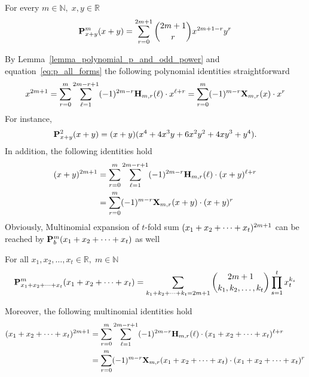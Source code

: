 \begin{lem}
    \label{lemma_polynomial_p_and_odd_power}
    For every $m\in\mathbb{N}, \; x,y\in\mathbb{R}$
    \begin{equation*}
        \polynomialP{m}{x+y}{x+y} = \sum_{r=0}^{2m+1} \binom{2m+1}{r} x^{2m+1-r} y^r
    \end{equation*}
\end{lem}
By Lemma~\ref{lemma_polynomial_p_and_odd_power} and equation~\eqref{eq:p_all_forms} the following
polynomial identities straightforward
\begin{equation*}
    x^{2m+1}
    =\sum_{r=0}^{m} \sum_{\ell=1}^{2m-r+1} (-1)^{2m-r} \coeffH{m}{r}{\ell} \cdot x^{\ell+r}
    =\sum_{r=0}^{m} (-1)^{m-r} \polynomialX{m}{r}{x} \cdot x^r
\end{equation*}
For instance,
\begin{equation*}
    \polynomialP{2}{x+y}{x+y} = (x + y) (x^4 + 4 x^3 y + 6 x^2 y^2 + 4 x y^3 + y^4).
\end{equation*}
In addition, the following identities hold
\begin{equation*}
    \begin{split}
    (x+y)
        ^{2m+1}
        &=\sum_{r=0}^{m} \sum_{\ell=1}^{2m-r+1} (-1)^{2m-r} \coeffH{m}{r}{\ell} \cdot (x+y)^{\ell+r} \\
        &=\sum_{r=0}^{m} (-1)^{m-r} \polynomialX{m}{r}{x+y} \cdot (x+y)^r
    \end{split}
\end{equation*}
Obviously, Multinomial expansion of $t$-fold sum $(\multifoldSum{t})^{2m+1}$ can be reached
by $\polynomialP{m}{b}{\multifoldSum{t}}$ as well
\begin{cor}
    For all $x_1,x_2,\ldots, x_t\in\mathbb{R}, \; m \in \mathbb{N}$
    \begin{equation*}
        \polynomialP{m}{\multifoldSum{t}}{\multifoldSum{t}}
        =
        \sum_{\multifoldSum[k]{t}=2m+1} \binom{2m+1}{k_1, k_2,\ldots, k_t} \prod_{s=1}^{t} x_t^{k_s}
    \end{equation*}
\end{cor}
Moreover, the following multinomial identities hold
\begin{equation*}
    \begin{split}
    (\multifoldSum{t})
        ^{2m+1}
        &=\sum_{r=0}^{m} \sum_{\ell=1}^{2m-r+1} (-1)^{2m-r} \coeffH{m}{r}{\ell} \cdot (\multifoldSum{t})^{\ell+r} \\
        &=\sum_{r=0}^{m} (-1)^{m-r} \polynomialX{m}{r}{\multifoldSum{t}} \cdot (\multifoldSum{t})^r
    \end{split}
\end{equation*}